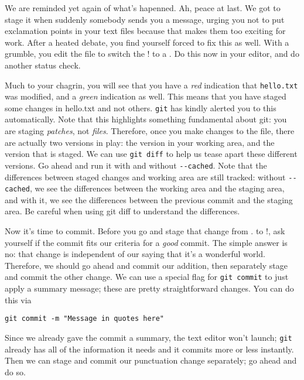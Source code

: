 \par{
We are reminded yet again of what's hapenned. Ah, peace at last. We got to
stage it when suddenly somebody sends you a message, urging you not to put
exclamation points in your text files because that makes them too exciting for
work. After a heated debate, you find yourself forced to fix this as well.
With a grumble, you edit the file to switch the ! to a . Do this now in your
editor, and do another status check.
}

\par{
Much to your chagrin, you will see that you have a \emph{red} indication that
\verb+hello.txt+ was modified, and a \emph{green} indication as well. This
means that you have staged some changes in hello.txt and not others.
\verb+git+ has kindly alerted you to this automatically. Note that this
highlights something fundamental about git: you are staging \emph{patches},
not \emph{files}. Therefore, once you make changes to the file, there are
actually two versions in play: the version in your working area, and the
version that is staged. We can use \verb+git diff+ to help us tease apart
these different versions. Go ahead and run it with and without
\verb+--cached+. Note that the differences between staged changes and working
area are still tracked: without \verb+--cached+, we see the differences
between the working area and the staging area, and with it, we see the
differences between the previous commit and the staging area. Be careful when
using git diff to understand the differences. 
}

\par{
Now it's time to commit. Before you go and stage that change from . to !, ask
yourself if the commit fits our criteria for a \emph{good} commit. The simple
answer is no: that change is independent of our saying that it's a wonderful
world. Therefore, we should go ahead and commit our addition, then separately
stage and commit the other change. We can use a special flag for \verb+git commit+ 
to just apply a summary message; these are pretty straightforward
changes. You can do this via
}

\begin{verbatim}
git commit -m "Message in quotes here"
\end{verbatim}

\par{
Since we already gave the commit a summary, the text editor won't launch;
\verb+git+ already has all of the information it needs and it commits more or
less instantly. Then we can stage and commit our punctuation change
separately; go ahead and do so. 
}

